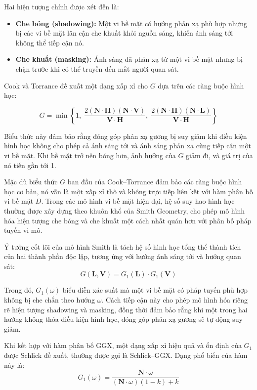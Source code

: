 Hai hiện tượng chính được xét đến là:
\begin{itemize}
	\item \textbf{Che bóng (shadowing):} Một vi bề mặt có hướng phản xạ phù hợp nhưng bị các vi bề mặt lân cận che khuất khỏi nguồn sáng, khiến ánh sáng tới không thể tiếp cận nó.
	\item \textbf{Che khuất (masking):} Ánh sáng đã phản xạ từ một vi bề mặt nhưng bị chặn trước khi có thể truyền đến mắt người quan sát.
\end{itemize}

Cook và Torrance đề xuất một dạng xấp xỉ cho $G$ dựa trên các ràng buộc hình học:

\begin{equation}
	G = \min \left\{
	1,\;
	\frac{2(\mathbf{N} \cdot \mathbf{H})(\mathbf{N} \cdot \mathbf{V})}{\mathbf{V} \cdot \mathbf{H}},\;
	\frac{2(\mathbf{N} \cdot \mathbf{H})(\mathbf{N} \cdot \mathbf{L})}{\mathbf{V} \cdot \mathbf{H}}
	\right\}
\end{equation}

Biểu thức này đảm bảo rằng đóng góp phản xạ gương bị suy giảm khi điều kiện hình học không cho phép cả ánh sáng tới và ánh sáng phản xạ cùng tiếp cận một vi bề mặt. Khi bề mặt trở nên bóng hơn, ảnh hưởng của $G$ giảm đi, và giá trị của nó tiến gần tới 1.

Mặc dù biểu thức $G$ ban đầu của Cook–Torrance đảm bảo các ràng buộc hình học cơ bản, nó vẫn là một xấp xỉ thô và không trực tiếp liên kết với hàm phân bố vi bề mặt $D$. Trong các mô hình vi bề mặt hiện đại, hệ số suy hao hình học thường được xây dựng theo khuôn khổ của Smith Geometry, cho phép mô hình hóa hiện tượng che bóng và che khuất một cách nhất quán hơn với phân bố pháp tuyến vi mô.

Ý tưởng cốt lõi của mô hình Smith là tách hệ số hình học tổng thể thành tích của hai thành phần độc lập, tương ứng với hướng ánh sáng tới và hướng quan sát:
\begin{equation}
	G(\mathbf{L}, \mathbf{V}) = G_1(\mathbf{L}) \cdot G_1(\mathbf{V})
\end{equation}

Trong đó, $G_1(\omega)$ biểu diễn xác suất mà một vi bề mặt có pháp tuyến phù hợp không bị che chắn theo hướng $\omega$. Cách tiếp cận này cho phép mô hình hóa riêng rẽ hiện tượng shadowing và masking, đồng thời đảm bảo rằng khi một trong hai hướng không thỏa điều kiện hình học, đóng góp phản xạ gương sẽ tự động suy giảm.

Khi kết hợp với hàm phân bố GGX, một dạng xấp xỉ hiệu quả và ổn định của $G_1$ được Schlick đề xuất, thường được gọi là Schlick--GGX. Dạng phổ biến của hàm này là:
\begin{equation}
	G_1(\omega) =
	\frac{\mathbf{N} \cdot \omega}
	{(\mathbf{N} \cdot \omega)(1 - k) + k}
\end{equation}

